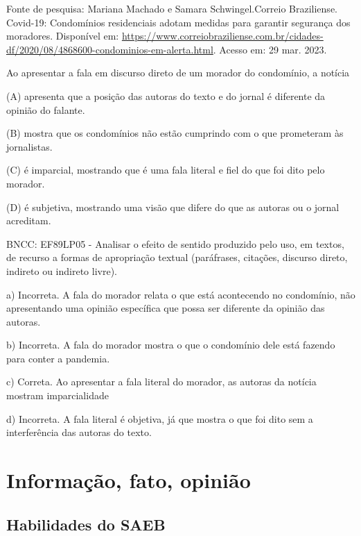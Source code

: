 \begin{itemize}
\begin{itemize}
{\begin{itemize}
Fonte de pesquisa: Mariana Machado e Samara Schwingel.Correio
Braziliense. Covid-19: Condomínios residenciais adotam medidas para
garantir segurança dos moradores. Disponível em:
\url{https://www.correiobraziliense.com.br/cidades-df/2020/08/4868600-condominios-em-alerta.html}.
Acesso em: 29 mar. 2023.

Ao apresentar a fala em discurso direto de um morador do condomínio, a
notícia

(A) apresenta que a posição das autoras do texto e do jornal é diferente
da opinião do falante.

(B) mostra que os condomínios não estão cumprindo com o que prometeram
às jornalistas.

(C) é imparcial, mostrando que é uma fala literal e fiel do que foi dito
pelo morador.

(D) é subjetiva, mostrando uma visão que difere do que as autoras ou o
jornal acreditam.

BNCC: EF89LP05 - Analisar o efeito de sentido produzido pelo uso, em
textos, de recurso a formas de apropriação textual (paráfrases,
citações, discurso direto, indireto ou indireto livre).

a) Incorreta. A fala do morador relata o que está acontecendo no
condomínio, não apresentando uma opinião específica que possa ser
diferente da opinião das autoras.

b) Incorreta. A fala do morador mostra o que o condomínio dele está
fazendo para conter a pandemia.

c) Correta. Ao apresentar a fala literal do morador, as autoras da
notícia mostram imparcialidade

d) Incorreta. A fala literal é objetiva, já que mostra o que foi dito
sem a interferência das autoras do texto.

\chapter{Informação, fato, opinião}

\section{Habilidades do SAEB}

\end{itemize}}
\end{itemize}
\end{itemize}
